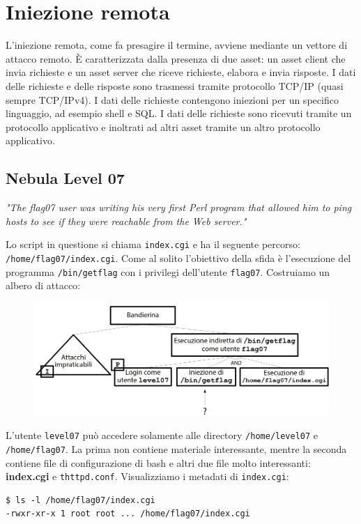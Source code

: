 \chapter{Iniezione remota}
L'iniezione remota, come fa presagire il termine, avviene mediante un vettore di attacco remoto. È caratterizzata dalla presenza di due asset: un asset client che invia richieste e un asset server che riceve richieste, elabora e invia risposte. I dati delle richieste e delle risposte sono trasmessi tramite protocollo TCP/IP (quasi sempre TCP/IPv4). I dati delle richieste contengono iniezioni per un specifico linguaggio, ad esempio shell e SQL. I dati delle richieste sono ricevuti tramite un protocollo applicativo e inoltrati ad altri asset tramite un altro protocollo applicativo. 

\section{Nebula Level 07}
\textit{"The flag07 user was writing his very first
Perl program that allowed him to ping hosts
to see if they were reachable from the Web
server."}

Lo script in questione si chiama \texttt{index.cgi} e ha il seguente percorso: \texttt{/home/flag07/index.cgi}. Come al solito l'obiettivo della sfida è l'esecuzione del programma \texttt{/bin/getflag} con i privilegi dell'utente \texttt{flag07}. Costruiamo un albero di attacco:

\begin{figure}[hbpt!]
    \centering
    \includegraphics[width=0.8 \textwidth]{./Images/cap6/6.1.png}
\end{figure}
\FloatBarrier

L'utente \texttt{level07} può accedere solamente alle directory \texttt{/home/level07} e \texttt{/home/flag07}. La prima non contiene materiale interessante, mentre la seconda contiene file di configurazione di bash e altri due file molto interessanti: \textbf{index.cgi} e \texttt{thttpd.conf}. Visualizziamo i metadati di \texttt{index.cgi}:

\begin{mdframed}[backgroundcolor=white!20,shadow=false]
\begin{lstlisting}
$ ls -l /home/flag07/index.cgi
-rwxr-xr-x 1 root root ... /home/flag07/index.cgi
\end{lstlisting}
\end{mdframed}

